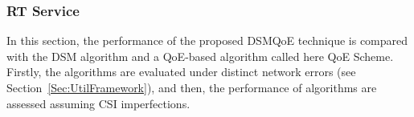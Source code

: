 \documentclass[conference]{IEEEtran}
\newcommand{\FigRef}[1]{Figure~\ref{#1}}
\newcommand{\SecRef}[1]{Section~\ref{#1}}
\begin{document}


\subsubsection{\ac{RT} Service}

In this section, the performance of the proposed DSMQoE technique is compared with the \ac{DSM} algorithm and a QoE-based algorithm called here QoE Scheme. Firstly, the algorithms are evaluated under distinct network errors (see \SecRef{Sec:UtilFramework}), and then, the performance of algorithms are assessed assuming \ac{CSI} imperfections.
\end{document}
